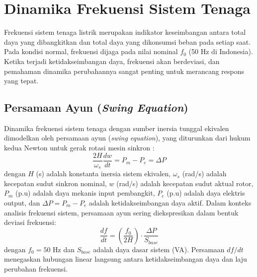 \section{Dinamika Frekuensi Sistem Tenaga}
\label{sec:Dinamika_Frekuensi_Sistem_Tenaga}

Frekuensi sistem tenaga listrik merupakan indikator keseimbangan antara total daya yang dibangkitkan dan total daya yang dikonsumsi beban pada setiap saat. Pada kondisi normal, frekuensi dijaga pada nilai nominal $f_0$ (50 Hz di Indonesia). Ketika terjadi ketidakseimbangan daya, frekuensi akan berdeviasi, dan pemahaman dinamika perubahannya sangat penting untuk merancang respons yang tepat.

\subsection{Persamaan Ayun (\textit{Swing Equation})}
\label{subsec:Persamaan_Ayun}

Dinamika frekuensi sistem tenaga dengan sumber inersia tunggal ekivalen dimodelkan oleh persamaan ayun (\textit{swing equation}), yang diturunkan dari hukum kedua Newton untuk gerak rotasi mesin sinkron \cite{Kundur1994}:
\begin{equation}
    \frac{2H}{\omega_s} \frac{dw}{dt} = P_m - P_e = \Delta P
\end{equation}
dengan $H$ (s) adalah konstanta inersia sistem ekivalen, $\omega_{s}$ (rad/s) adalah kecepatan sudut sinkron nominal, $w$ (rad/s) adalah kecepatan sudut aktual rotor, $P_{m}$ (p.u) adalah daya mekanis input pembangkit, $P_{e}$ (p.u) adalah daya elektris output, dan $\Delta P=P_{m}-P_{e}$ adalah ketidakseimbangan daya aktif. Dalam konteks analisis frekuensi sistem, persamaan ayun sering diekspresikan dalam bentuk deviasi frekuensi:
\begin{equation}
    \frac{df}{dt} = \left(\frac{f_{0}}{2H}\right) \cdot \frac{\Delta P}{S_{base}}
\end{equation}
dengan $f_{0}=50 \text{ Hz}$ dan $S_{base}$ adalah daya dasar sistem (VA). Persamaan $df/dt$ menegaskan hubungan linear langsung antara ketidakseimbangan daya dan laju perubahan frekuensi. 

